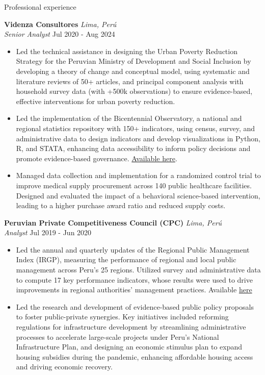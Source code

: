 \documentclass{resume} %
\begin{document}
\begin{rSection}{Professional experience}

\textbf{Videnza Consultores} \hfill \textit{Lima, Perú} \\
\textit{Senior Analyst}  \hfill Jul 2020 - Aug 2024
 \begin{itemize}
    \itemsep -3pt {} 
      \item Led the technical assistance in designing the Urban Poverty Reduction Strategy for the Peruvian Ministry of Development and Social Inclusion by developing a theory of change and conceptual model, using systematic and literature reviews of 50+ articles, and principal component analysis with household survey data (with +500k observations) to ensure evidence-based, effective interventions for urban poverty reduction.
      \item Led the implementation of the Bicentennial Observatory, a national and regional statistics repository with 150+ indicators, using census, survey, and administrative data to design indicators and develop visualizations in Python, R, and STATA, enhancing data accessibility to inform policy decisions and promote evidence-based governance. \href{https://propuestasdelbicentenario.pe/observatorio/}{Available here}.
      \item Managed data collection and implementation for a randomized control trial to improve medical supply procurement across 140 public healthcare facilities. Designed and evaluated the impact of a behavioral science-based intervention, leading to a higher purchase award ratio and reduced supply costs.
   \end{itemize}
 
 \textbf{Peruvian Private Competitiveness Council (CPC)} \hfill \textit{Lima, Perú}\\
\textit{Analyst} \hfill Jul 2019 - Jun 2020
 \begin{itemize}
    \itemsep -3pt {} 
      \item Led the annual and quarterly updates of the Regional Public Management Index (IRGP), measuring the performance of regional and local public management across Peru’s 25 regions. Utilized survey and administrative data to compute 17 key performance indicators, whose results were used to drive improvements in regional authorities’ management practices. Available \href{https://www.compite.pe/wp-content/uploads/2020/07/IRGP-2020-version-final.pdf}{here}
      \item Led the research and development of evidence-based public policy proposals to foster public-private synergies. Key initiatives included reforming regulations for infrastructure development by streamlining administrative processes to accelerate large-scale projects under Peru's National Infrastructure Plan, and designing an economic stimulus plan to expand housing subsidies during the pandemic, enhancing affordable housing access and driving economic recovery.
 \end{itemize}


\end{rSection}
\end{document}
